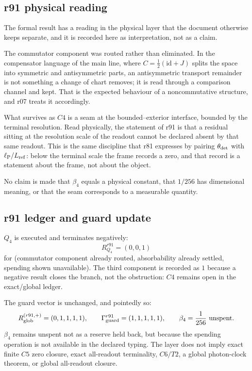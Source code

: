 \subsection*{r91 physical reading}
\label{subsec:r91-physical-reading}

The formal result has a reading in the physical layer that the document otherwise keeps
separate, and it is recorded here as interpretation, not as a claim.

The commutator component was routed rather than eliminated.  In the compensator language of
the main line, where \(C=\tfrac12(\mathrm{id}+J)\) splits the space into symmetric and
antisymmetric parts, an antisymmetric transport remainder is not something a change of chart
removes; it is read through a comparison channel and kept.  That is the expected behaviour of
a noncommutative structure, and r07 treats it accordingly.

What survives as \(C4\) is a seam at the bounded--exterior interface, bounded by the terminal
resolution.  Read physically, the statement of r91 is that a residual sitting at the
resolution scale of the readout cannot be declared absent by that same readout.  This is the
same discipline that r81 expresses by pairing \(\theta_{\rm det}\) with \(\ell_{\rm P}/L_{\rm
ref}\): below the terminal scale the frame records a zero, and that record is a statement
about the frame, not about the object.

No claim is made that \(\beta_4\) equals a physical constant, that \(1/256\) has dimensional
meaning, or that the seam corresponds to a measurable quantity.

\subsection*{r91 ledger and guard update}
\label{subsec:r91-ledger-guard}

\(Q_4\) is executed and terminates negatively:
\[
R_{Q_4}^{r91}=(0,0,1)
\]
for (commutator component already routed, absorbability already settled, spending shown
unavailable).  The third component is recorded as \(1\) because a negative result closes the
branch, not the obstruction: \(C4\) remains open in the exact/global ledger.

The guard vector is unchanged, and pointedly so:
\[
R_{\rm glob}^{(r91,+)}=(0,1,1,1,1),
\qquad
\Gamma_{\rm guard}^{r91}=(1,1,1,1,1),
\qquad
\beta_4=\frac1{256}\ \text{unspent}.
\]
\(\beta_4\) remains unspent not as a reserve held back, but because the spending operation is
not available in the declared typing.  The layer does not imply exact finite \(C5\) zero
closure, exact all-readout terminality, \(C6/T2\), a global photon-clock theorem, or
global all-readout closure.


